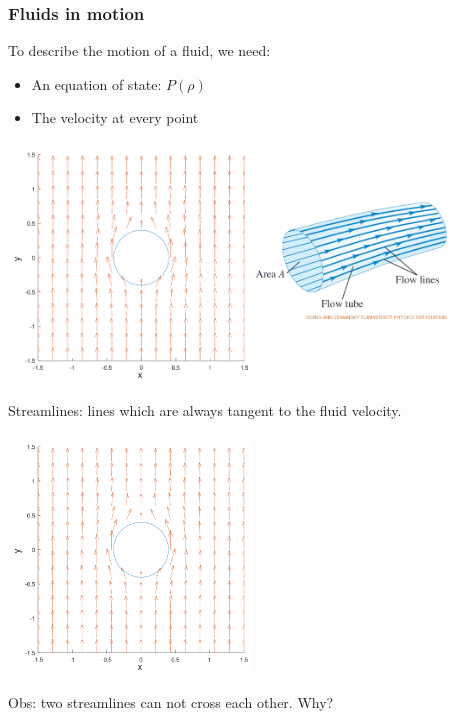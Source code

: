 \documentclass[]{beamer}
\begin{document}
\begin{frame}
  \frametitle{Fluids in motion}
To describe the motion of a fluid, we need:


\vspace{5 mm}

\pause
\begin{itemize}
  \item An equation of state: $P(\rho)$
  \item The velocity at every point
\end{itemize}



  \end{frame}




\begin{frame}


  \begin{center}
    \includegraphics[height=2.5in]{images2/Vector_field_v.png}
  \end{center}

  

  \end{frame}


  \begin{frame}

 Streamlines: lines which are always tangent to the fluid velocity.

 \begin{center}
  \includegraphics[height=2.5in]{images2/Streamlines.png}
\end{center}

\textcolor{mypink1}{  Obs: two streamlines can not cross each other. Why?}
\end{frame}
\end{document}
